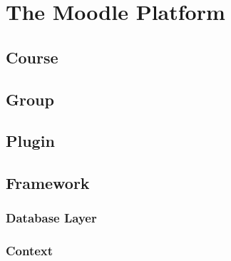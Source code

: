 
\section{The Moodle Platform}
\label{}
\subsection{Course}
\subsection{Group}
\subsection{Plugin}
\subsection{Framework}
\subsubsection{Database Layer}
\subsubsection{Context}